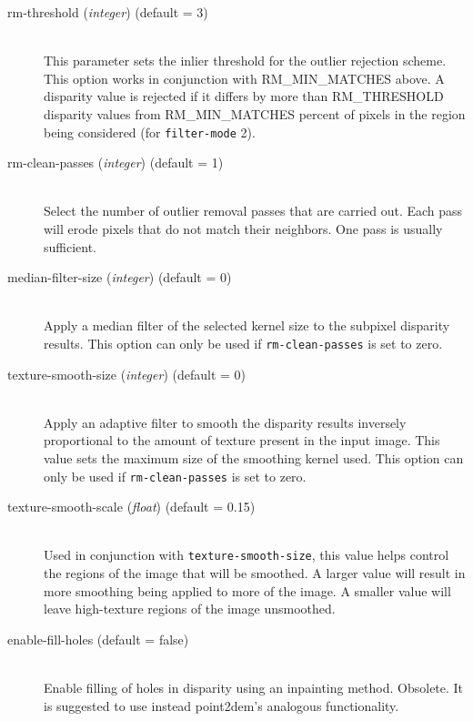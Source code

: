 \begin{description}
\item[rm-threshold \textnormal{\small{(\emph{integer})}} (default = 3)] \hfill \\
  This parameter sets the inlier threshold for the outlier rejection
  scheme.  This option works in conjunction with RM\_MIN\_MATCHES
  above.  A disparity value is rejected if it differs by more than
  RM\_THRESHOLD disparity values from RM\_MIN\_MATCHES percent of
  pixels in the region being considered  (for \texttt{filter-mode} 2).

\item[rm-clean-passes \textnormal{\small{(\emph{integer})}} (default = 1)] \hfill \\
  Select the number of outlier removal passes that are carried out.
  Each pass will erode pixels that do not match their neighbors.  One
  pass is usually sufficient.

\item[median-filter-size \textnormal{\small{(\emph{integer})}} (default = 0)] \hfill \\
  Apply a median filter of the selected kernel size to the subpixel disparity results.
  This option can only be used if \texttt{rm-clean-passes} is set to zero.

\item[texture-smooth-size \textnormal{\small{(\emph{integer})}} (default = 0)] \hfill \\
  Apply an adaptive filter to smooth the disparity results inversely proportional to
  the amount of texture present in the input image.  This value sets the maximum size 
  of the smoothing kernel used.
  This option can only be used if \texttt{rm-clean-passes} is set to zero.

\item[texture-smooth-scale \textnormal{\small{(\emph{float})}} (default = 0.15)] \hfill \\
  Used in conjunction with \texttt{texture-smooth-size}, this value helps control the 
  regions of the image that will be smoothed.  A larger value will result in more 
  smoothing being applied to more of the image.  A smaller value will leave high-texture
  regions of the image unsmoothed.

\item[enable-fill-holes (default = false)] \hfill \\

Enable filling of holes in disparity using an inpainting
method. Obsolete. It is suggested to use instead point2dem's analogous
functionality.


\end{description}
